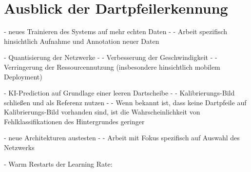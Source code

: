 \section{Ausblick der Dartpfeilerkennung}
\label{sec:ausblick_ki}

- neues Trainieren des Systems auf mehr echten Daten
- - Arbeit spezifisch hinsichtlich Aufnahme und Annotation neuer Daten

- Quantisierung der Netzwerke
- - Verbesserung der Geschwindigkeit
- - Verringerung der Ressourcennutzung (insbesondere hinsichtlich mobilem Deployment)

- KI-Prediction auf Grundlage einer leeren Dartscheibe
- - Kalibrierungs-Bild schließen und als Referenz nutzen
- - Wenn bekannt ist, dass keine Dartpfeile auf Kalibrierungs-Bild vorhanden sind, ist die Wahrscheinlichkeit von Fehlklassifikationen des Hintergrundes geringer

- neue Architekturen austesten
- - Arbeit mit Fokus spezifisch auf Auswahl des Netzwerks

- Warm Restarts der Learning Rate: \cite{lr_warm_restart}

